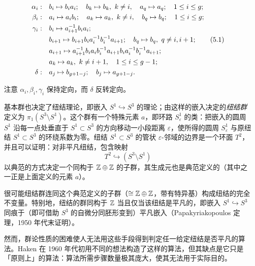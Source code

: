 \begin{align}
\alpha_{i}:&\quad b_{i}\mapsto b_{i}a_{i};\quad b_{k}\mapsto b_{k},\ k\neq i,\quad a_{q}\mapsto a_{q};\quad 1\le i\le g;\notag\\
\beta_{i}:&\quad a_{i}\mapsto a_{i}b_{i};\quad a_{k}\mapsto a_{k},\ k\neq i,\quad b_{q}\mapsto b_{q};\quad 1\le i\le g;\notag\\
\gamma_{i}:&\quad b_{i}\mapsto a_{i+1}^{-1}b_{i}a_{i};\notag\\
&\quad b_{i+1}\mapsto b_{i+1}b_{i}a_{i}^{-1}b_{i}^{-1}a_{i+1};\quad b_{q}\mapsto b_{q},\ q\neq i,i+1; \tag{5.1}\\
&\quad a_{i+1}\mapsto a_{i+1}^{-1}b_{i}a_{i}b_{i}^{-1}a_{i+1}b_{i}a_{i}^{-1}b_{i}^{-1}a_{i+1};\notag\\
&\quad a_{k}\mapsto a_{k},\ k\neq i+1,\quad 1\le i\le g-1;\notag\\
\delta:&\quad a_{j}\mapsto b_{g+1-j};\quad b_{j}\mapsto a_{g+1-j}.\notag
\end{align}


注意 $\alpha_{i},\beta_{i},\gamma_{i}$ 保持定向，而 $\delta$ 反转定向。

基本群也决定了纽结理论，即嵌入 $S^{1}\hookrightarrow S^{3}$ 的理论；由这样的嵌入决定的\emph{纽结群}定义为 $\pi_{1}(S^{3}\setminus S^{1})$。这个群有一个特殊元素 $a$，即环路 $S_{\varepsilon}^{1}$ 的类：把嵌入的圆周 $S^{1}$ 沿每一点处垂直于 $S^{1}\subset S^{3}$ 的方向移动一小段距离 $\varepsilon$，使所得的圆周 $S_{\varepsilon}^{1}$ 与原纽结 $S^{1}\subset S^{3}$ 的环绕系数为零。纽结 $S^{1}\subset S^{3}$ 的管状 $\varepsilon$-邻域的边界是一个环面 $T^{2}$，并且可以证明：对非平凡纽结，包含映射
\[
T^{2}\hookrightarrow(S^{3}\setminus S^{1})
\]
以典范的方式决定一个同构于 $\mathbb{Z}\oplus\mathbb{Z}$ 的子群，其生成元也是典范定义的（其中之一正是上面定义的元素 $a$）。

很可能纽结群连同这个典范定义的子群（$\cong\mathbb{Z}\oplus\mathbb{Z}$，带有特异基）构成纽结的完全不变量。特别地，纽结的群同构于 $\mathbb{Z}$ 当且仅当该纽结是平凡的，即嵌入 $S^{1}\hookrightarrow S^{3}$ 同痕于（即可借助 $S^{3}$ 的自微分同胚形变到）平凡嵌入（Papakyriakopoulos 定理，1950 年代末证明）。

然而，群论性质的困难使人无法用这些手段得到判定任一给定纽结是否平凡的算法。Haken 在 1960 年代初用不同的想法构造了这样的算法，但其缺点是它只是「原则上」的算法：算法所需步骤数量极其庞大，使其无法用于实际目的。

